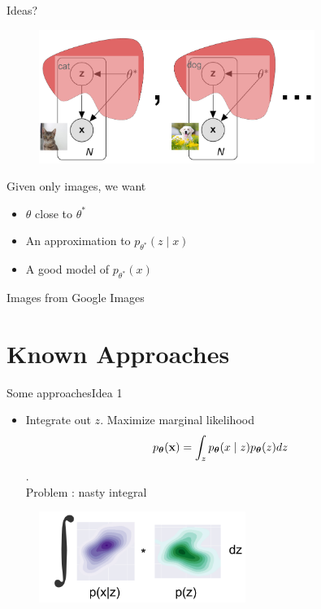 \documentclass{beamer}
\begin{document}
\begin{frame}{Ideas?}
    \begin{figure}
        \centering
        \includegraphics[width=0.8\textwidth]{latent_hidden_concrete}
    \end{figure}
    Given only images, we want
    \begin{itemize}
        \item $\theta$ close to $\theta^*$
        \item An approximation to $p_{\theta^*}(z \mid x)$
        \item A good model of $p_{\theta^*}(x)$
    \end{itemize}
    {\small Images from Google Images}
\end{frame}

\section{Known Approaches}

\begin{frame}{Some approaches}{Idea 1}

    \begin{itemize}
        \item {
            Integrate out $z$. Maximize marginal likelihood $$p_{\boldsymbol{\theta}}(\mathbf{x}) = \int_{z} p_{\boldsymbol{\theta}}(x \mid z) p_{\boldsymbol{\theta}}(z) dz$$ . \\
            \pause
            Problem : nasty integral
        }
    \end{itemize}

    \begin{figure}
        \centering
        \includegraphics[width=0.6\textwidth]{marginal_likelihood_illustration}
    \end{figure}
\end{frame}
\end{document}
